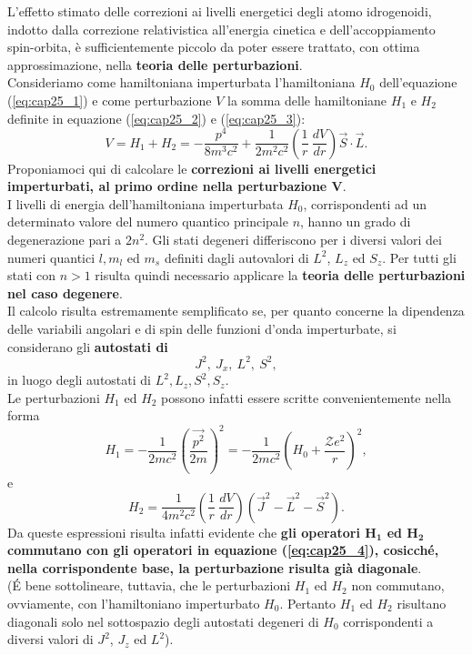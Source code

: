 \documentclass[a4paper,12pt,oneside]{book}
\begin{document}
L'effetto stimato delle correzioni ai livelli energetici degli atomo idrogenoidi, indotto dalla correzione relativistica all'energia cinetica e dell'accoppiamento spin-orbita, è sufficientemente piccolo da poter essere trattato, con ottima approssimazione, nella \textbf{teoria delle perturbazioni}. \\
Consideriamo come hamiltoniana imperturbata l'hamiltoniana $H_0$ dell'equazione (\ref{eq:cap25_1}) e come perturbazione $V$ la somma delle hamiltoniane $H_1$ e $H_2$ definite in equazione (\ref{eq:cap25_2}) e (\ref{eq:cap25_3}):
\begin{equation} 
V=H_1+H_2=-\frac{p^4}{8m^3c^2}+\frac{1}{2m^2c^2} \left( \frac{1}{r} \ \frac{dV}{dr} \right) \vec{S} \cdot \vec{L} .
\end{equation}
Proponiamoci qui di calcolare le \textbf{correzioni ai livelli energetici imperturbati, al primo ordine nella perturbazione $\boldsymbol{V}$}. \\
I livelli di energia dell'hamiltoniana imperturbata $H_0$, corrispondenti ad un determinato valore del numero quantico principale $n$, hanno un grado di degenerazione pari a $2n^2$. Gli stati degeneri differiscono per i diversi valori dei numeri quantici $l,m_l$ ed $m_s$ definiti dagli autovalori di $L^2$, $L_z$ ed $S_z$. Per tutti gli stati con $n>1$ risulta quindi necessario applicare la \textbf{teoria delle perturbazioni nel caso degenere}. \\
Il calcolo risulta estremamente semplificato se, per quanto concerne la dipendenza delle variabili angolari e di spin delle funzioni d'onda imperturbate, si considerano gli \textbf{autostati di}
\begin{equation} \label{eq:cap25_4}
J^2, \ J_x, \ L^2, \ S^2 ,
\end{equation}
in luogo degli autostati di $L^2, L_z, S^2, S_z$. \\
Le perturbazioni $H_1$ ed $H_2$ possono infatti essere scritte convenientemente nella forma
\begin{equation} \label{eq:cap25_5}
H_1=-\frac{1}{2mc^2} \left( \frac{\vec{p^2}}{2m} \right)^2 = -\frac{1}{2mc^2} \left( H_0+\frac{\mathcal{Z}e^2}{r} \right)^2 ,
\end{equation}
e
\begin{equation} \label{eq:cap25_6}
H_2=\frac{1}{4m^2c^2} \left( \frac{1}{r} \ \frac{dV}{dr} \right) \left(\vec{J}^2-\vec{L}^2-\vec{S}^2 \right) .
\end{equation}
Da queste espressioni risulta infatti evidente che \textbf{gli operatori $\boldsymbol{H_1}$ ed $\boldsymbol{H_2}$ commutano con gli operatori in equazione (\ref{eq:cap25_4}), cosicché, nella corrispondente base, la perturbazione risulta già diagonale}. \\ (\'E bene sottolineare, tuttavia, che le perturbazioni $H_1$ ed $H_2$ non commutano, ovviamente, con l'hamiltoniano imperturbato $H_0$. Pertanto $H_1$ ed $H_2$ risultano diagonali solo nel sottospazio degli autostati degeneri di $H_0$ corrispondenti a diversi valori di $J^2$, $J_z$ ed $L^2$). \\
\end{document}
